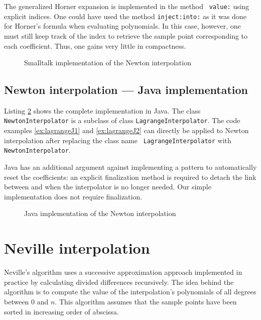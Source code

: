 \documentclass[twoside]{book}
\begin{document}
The generalized Horner expansion is implemented in the method {\tt
value:} using explicit indices. One could have used the method
{\tt inject:into:} as it was done for Horner's formula when
evaluating polynomials. In this case, however, one must still keep
track of the index to retrieve the sample point corresponding to
each coefficient. Thus, one gains very little in compactness.


\begin{figure}\begin{listing} \caption{Smalltalk implementation of the Newton interpolation}
\label{ls:newtonint}

\end{listing}\end{figure}

\subsection{Newton interpolation --- Java implementation}
Listing \ref{lj:newtonint} shows the complete implementation in
Java. The class {\tt NewtonInterpolator} is a subclass of class
{\tt LagrangeInterpolator}. The code examples \ref{ex:lagrangeJ1}
and \ref{ex:lagrangeJ2} can directly be applied to Newton
interpolation after replacing the class name {\tt
LagrangeInterpolator} with {\tt NewtonInterpolator}.

Java has an additional argument against implementing a
 pattern to automatically reset the
coefficients: an explicit finalization method is required to
detach the link between  and
 when the interpolator is no longer needed.
Our simple implementation does not require finalization.

\begin{figure}\begin{listing} \caption{Java implementation of the Newton interpolation}
\label{lj:newtonint}

\end{listing}\end{figure}

\section{Neville interpolation}
\label{sec:neville} Neville's algorithm uses a successive
approximation approach implemented in practice by calculating
divided differences recursively. The idea behind the algorithm is
to compute the value of the interpolation's polynomials of all
degrees between 0 and $n$. This algorithm assumes that the sample
points have been sorted in increasing order of abscissa.
\end{document}
